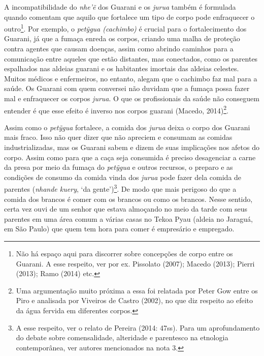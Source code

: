 A incompatibilidade do \emph{nhe'ẽ} dos Guarani e os \emph{jurua} também
é formulada quando comentam que aquilo que fortalece um tipo de corpo
pode enfraquecer o outro\footnote{Não há espaço aqui para discorrer
  sobre concepções de corpo entre os Guarani. A esse respeito, ver por
  ex. Pissolato (2007); Macedo (2013); Pierri (2013); Ramo (2014) etc.}.
Por exemplo, o \emph{petỹgua (cachimbo)} é crucial para o fortalecimento
dos Guarani, já que a fumaça enreda os corpos, criando uma malha de
proteção contra agentes que causam doenças, assim como abrindo caminhos
para a comunicação entre aqueles que estão distantes, mas conectados,
como os parentes espalhados nas aldeias guarani e os habitantes imortais
das aldeias celestes. Muitos médicos e enfermeiros, no entanto, alegam
que o cachimbo faz mal para a saúde. Os Guarani com quem conversei não
duvidam que a fumaça possa fazer mal e enfraquecer os corpos
\emph{jurua}. O que os profissionais da saúde não conseguem entender é
que esse efeito é inverso nos corpos guarani (Macedo, 2014)\footnote{Uma
  argumentação muito próxima a essa foi relatada por Peter Gow entre os
  Piro e analisada por Viveiros de Castro (2002), no que diz respeito ao
  efeito da água fervida em diferentes corpos.}.

Assim como o \emph{petỹgua} fortalece, a comida dos \emph{jurua} deixa o
corpo dos Guarani mais fraco. Isso não quer dizer que não apreciem e
consumam as comidas industrializadas, mas os Guarani sabem e dizem de
suas implicações nos afetos do corpo. Assim como para que a caça seja
consumida é preciso desagenciar a carne da presa por meio da fumaça do
\emph{petỹgua} e outros recursos, o preparo e as condições de consumo da
comida vinda dos \emph{jurua} pode fazer dela comida de parentes
(\emph{nhande kuery}, `da gente')\footnote{A esse respeito, ver o relato
  de Pereira (2014: 47ss). Para um aprofundamento do debate sobre
  comensalidade, alteridade e parentesco na etnologia contemporânea, ver
  autores mencionados na nota 3.}. De modo que mais perigoso do que a
comida dos brancos é comer com os brancos ou como os brancos. Nesse
sentido, certa vez ouvi de um senhor que estava almoçando no meio da
tarde com seus parentes em uma área comum a várias casas no Tekoa Pyau
(aldeia no Jaraguá, em São Paulo) que quem tem hora para comer é
empresário e empregado.

